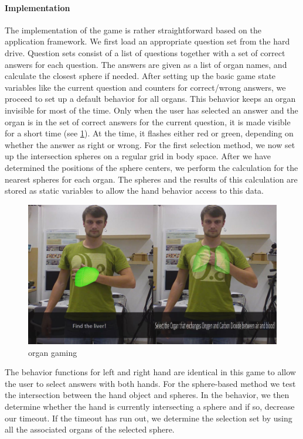 \paragraph{Implementation}
The implementation of the game is rather straightforward based on the application framework. We first load an appropriate question set from the hard drive. Question sets consist of a list of questions together with a set of correct answers for each question. The answers are given as a list of organ names, and calculate the closest sphere if needed.
After setting up the basic game state variables like the current question and counters for correct/wrong answers, we proceed to set up a default behavior for all organs. This behavior keeps an organ invisible for most of the time. Only when the user has selected an answer and the organ is in the set of correct answers for the current question, it is made visible for a short time (see \figurename{\ref{fig:3-IMR:organGaming}}). At the time, it flashes either red or green, depending on whether the answer as right or wrong.
For the first selection method, we now set up the intersection spheres on a regular grid in body space. After we have determined the positions of the sphere centers, we perform the calculation for the nearest spheres for each organ. The spheres and the results of this calculation are stored as static variables to allow the hand behavior access to this data.
\begin{figure}
	\centering
	\includegraphics[width=0.7\linewidth]{figures/3-IMR/organGaming}
	\caption{organ gaming}
	\label{fig:3-IMR:organGaming}
\end{figure}
The behavior functions for left and right hand are identical in this game to allow the user to select answers with both hands.
For the sphere-based method we test the intersection between the hand object and spheres. In the behavior, we then determine whether the hand is currently intersecting a sphere and if so, decrease our timeout. If the timeout has run out, we determine the selection set by using all the associated organs of the selected sphere.
